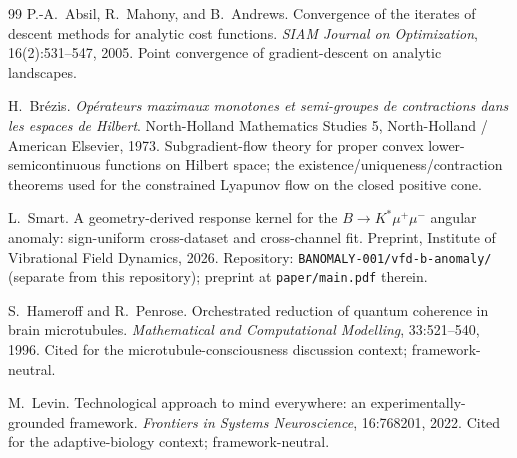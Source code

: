 \documentclass[11pt]{article}
\theoremstyle{definition}
\begin{document}
\begin{thebibliography}{99}
P.-A.~Absil, R.~Mahony, and B.~Andrews.
\newblock Convergence of the iterates of descent methods for analytic cost functions.
\newblock \emph{SIAM Journal on Optimization}, 16(2):531--547, 2005.
\newblock Point convergence of gradient-descent on analytic landscapes.

H.~Br\'{e}zis.
\newblock \emph{Op\'{e}rateurs maximaux monotones et semi-groupes de contractions
  dans les espaces de Hilbert}.
\newblock North-Holland Mathematics Studies 5, North-Holland / American Elsevier, 1973.
\newblock Subgradient-flow theory for proper convex lower-semicontinuous
  functions on Hilbert space; the existence/uniqueness/contraction theorems
  used for the constrained Lyapunov flow on the closed positive cone.

L.~Smart.
\newblock A geometry-derived response kernel for the $B \to K^{*}\mu^{+}\mu^{-}$ angular anomaly: sign-uniform cross-dataset and cross-channel fit.
\newblock Preprint, Institute of Vibrational Field Dynamics, 2026.
\newblock Repository: \texttt{BANOMALY-001/vfd-b-anomaly/} (separate from this repository); preprint at \texttt{paper/main.pdf} therein.

S.~Hameroff and R.~Penrose.
\newblock Orchestrated reduction of quantum coherence in brain microtubules.
\newblock \emph{Mathematical and Computational Modelling}, 33:521--540, 1996.
\newblock Cited for the microtubule-consciousness discussion context; framework-neutral.

M.~Levin.
\newblock Technological approach to mind everywhere: an experimentally-grounded framework.
\newblock \emph{Frontiers in Systems Neuroscience}, 16:768201, 2022.
\newblock Cited for the adaptive-biology context; framework-neutral.

\end{thebibliography}
\end{document}
